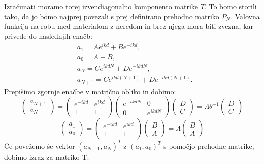 \begin{appendices}
Izračunati moramo torej izvendiagonalno komponento matrike $T$. To bomo storili tako, da jo bomo najprej povezali s prej definirano prehodno matriko $P_N$.
Valovna funkcija na robu med materialom z neredom in brez njega mora biti zvezna, kar privede do naslednjih enačb:
\begin{align}
&a_1 = Ae^{ikd} + Be^{-ikd}, \\
&a_0 = A+B, \\
&a_N = C e^{ikdN} + D e^{-ikdN}, \\
&a_{N+1} = C e^{ikd(N+1)} + De^{-ikd(N+1)}.
\end{align}
Prepišimo zgornje enačbe v matrično obliko in dobimo:
\begin{equation}
\begin{pmatrix} a_{N+1} \\ a_N \end{pmatrix} = 
\begin{pmatrix} e^{-ikd} & e^{ikd} \\ 1 & 1 \end{pmatrix} \begin{pmatrix} e^{-ikdN} & 0 \\ 0 & e^{ikdN} \end{pmatrix} \begin{pmatrix} D \\ C \end{pmatrix} =
\Lambda \theta^{-1} \begin{pmatrix} D \\ C \end{pmatrix}
\end{equation}
\begin{equation}
\begin{pmatrix} a_1  \\ a_0 \end{pmatrix} = \begin{pmatrix} e^{-ikd} &  e^{ikd} \\ 1 & 1 \end{pmatrix} \begin{pmatrix} B \\ A \end{pmatrix} = \Lambda \begin{pmatrix} B \\ A \end{pmatrix}
\end{equation}
Če povežemo še vektor $(a_{N+1}, a_N)^T$ z $(a_1, a_0)^T$ s pomočjo prehodne matrike, dobimo izraz za matriko T:
\begin{equation}

\end{equation}
\end{appendices}
